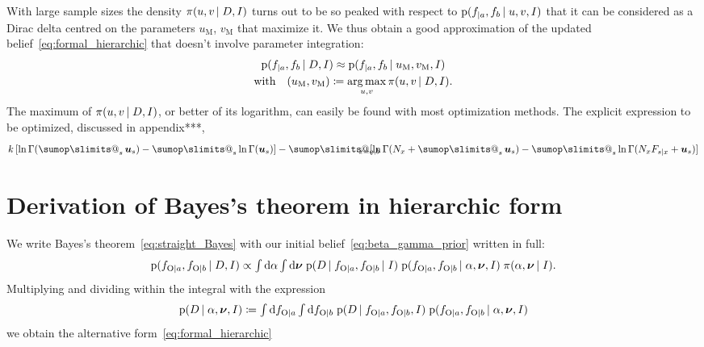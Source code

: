 \documentclass[\ifafour a4paper,12pt,\else a5paper,10pt,\fi%
onecolumn,oneside,article,%
british%
]{memoir}
\makeatletter
\theoremstyle{remark}
\theoremstyle{innote}
\def\sum{\DOTSI\sumop\slimits@}
\newcommand*{\di}{\mathrm{d}}%
\newcommand*{\defd}{\coloneqq}
\newcommand*{\pf}{\mathrm{p}}%
\renewcommand*{\|}[1][]{\nonscript\,#1\vert\nonscript\;\mathopen{}}
\newcommand*{\tsum}{\mathop{\textstyle\sum}\nolimits}
\newcommand*{\tint}{\begingroup\textstyle\int\endgroup\nolimits}
\DeclareMathOperator*{\argmax}{arg\,max}
\newcommand*{\yD}{D}
\newcommand*{\yI}{I}
\newcommand*{\ya}{a}
\newcommand*{\yb}{b}
\newcommand*{\ysA}{\textrm{O}}%
\newcommand*{\dbeta}{\betaup}
\newcommand*{\dA}{\pi}
\newcommand*{\yA}{\alpha}
\newcommand*{\yqq}{\nu}
\newcommand*{\yq}{\bm{\yqq}}
\newcommand*{\yu}{\bm{u}}
\newcommand*{\yua}{u}
\newcommand*{\yub}{v}
\newcommand*{\yuam}{\yua_{\text{M}}}
\newcommand*{\yubm}{\yub_{\text{M}}}
\newcommand*{\yna}{k}
\makeatother
\begin{document}
With large sample sizes the density $\dA(\yua,\yub \|\yD, \yI)$ turns out to
be so peaked with respect to
$\pf(f_{|\ya}, f_{\yb}\| \yua,\yub,\yI)$ that it can be considered
as a Dirac delta centred on the parameters $\yuam$, $\yubm$ that maximize it.
We thus obtain a good approximation of the updated
belief~\eqref{eq:formal_hierarchic} that doesn't involve parameter integration:
\begin{multline}
  \label{eq:formal_hierarchic_approx}
  \pf(f_{|\ya}, f_{\yb} \| \yD, \yI) \approx
  \pf(f_{|\ya}, f_{\yb}\| \yuam,\yubm,\yI)\\
  \text{with}\quad
  (\yuam,\yubm) \defd \argmax_{\yua,\yub}\dA(\yua,\yub \|\yD, \yI).
\end{multline}
The maximum of $\dA(\yua,\yub \|\yD, \yI)$, or better of its logarithm, can
easily be found with most optimization methods. The explicit expression to
be optimized, discussed in appendix***,
\begin{equation}
  \label{eq:to_optimize}
  \yna\,[\ln\Gamma(\tsum_s\yu_s) - \tsum_s\ln\Gamma(\yu_s)]
  -\sum_{\mathclap{x=\ya,\yb}}
  [\ln\Gamma(N_x+\tsum_s\yu_s) - \tsum_s\ln\Gamma(N_xF_{s\|x}+\yu_s)]
\end{equation}


\section{Derivation of Bayes's theorem in hierarchic form}
\label{sec:bayes_hierarcic}

We write Bayes's theorem~\eqref{eq:straight_Bayes} with our initial
belief~\eqref{eq:beta_gamma_prior} written in full:
\begin{equation}
  \label{eq:straight_Bayes_full_prior}
  \pf(f_{\ysA\|\ya}, f_{\ysA\|\yb} \| \yD, \yI)
  \propto
  \tint\di\yA\tint\di\yq\;
    \pf(\yD \| f_{\ysA\|\ya}, f_{\ysA\|\yb} \| \yI)\;
 \pf(f_{\ysA\|\ya}, f_{\ysA\|\yb} \|\yA,\yq, \yI)\;
  \dA(\yA,\yq \|\yI).
\end{equation}
Multiplying and dividing within the integral with the expression
\begin{equation}
  \label{eq:def_Aq_given_data}
    \pf(\yD \|\yA,\yq,\yI)\defd
\tint\di f_{\ysA\|\ya}\tint\di f_{\ysA\|\yb}\;
  \pf(\yD \|f_{\ysA\|\ya}, f_{\ysA\|\yb}, \yI)\;
  \pf(f_{\ysA\|\ya}, f_{\ysA\|\yb}\| \yA,\yq,\yI)
\end{equation}
we obtain the alternative form~\eqref{eq:formal_hierarchic}
\end{document}
